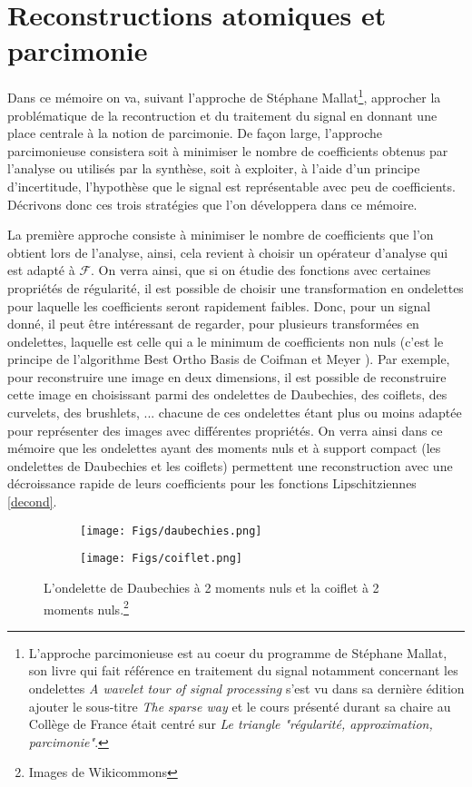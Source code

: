 \section{Reconstructions atomiques et parcimonie}
Dans ce mémoire on va, suivant l'approche de Stéphane Mallat\footnote{L'approche parcimonieuse est au coeur du programme de Stéphane Mallat, son livre qui fait référence en traitement du signal notamment concernant les ondelettes \emph{A wavelet tour of signal processing} s'est vu dans sa dernière édition ajouter le sous-titre \emph{The sparse way} et le cours présenté durant sa chaire au Collège de France était centré sur \emph{Le triangle "régularité, approximation, parcimonie"}.},
approcher la problématique de la recontruction et du traitement du signal en donnant une place centrale à la notion de parcimonie.
De façon large, l'approche parcimonieuse consistera soit à minimiser le nombre de coefficients obtenus par l'analyse ou utilisés par la synthèse, soit à exploiter, à l'aide d'un principe d'incertitude, l'hypothèse que le signal est représentable avec peu de coefficients.
Décrivons donc ces trois stratégies que l'on développera dans ce mémoire.
\newline

La première approche consiste à minimiser le nombre de coefficients que l'on obtient lors de l'analyse, ainsi, cela revient à choisir un opérateur d'analyse qui est adapté à $\mathcal{F}$.
On verra ainsi, que si on étudie des fonctions avec certaines propriétés de régularité, il est possible de choisir une transformation en ondelettes pour laquelle les coefficients seront rapidement faibles. 
Donc, pour un signal donné, il peut être intéressant de regarder, pour plusieurs transformées en ondelettes, laquelle est celle qui a le minimum de coefficients non nuls (c'est le principe de l'algorithme Best Ortho Basis de Coifman et Meyer \cite{coifortho}).
Par exemple, pour reconstruire une image en deux dimensions, il est possible de reconstruire cette image en choisissant parmi des ondelettes de Daubechies, des coiflets, des curvelets, des brushlets, ...
chacune de ces ondelettes étant plus ou moins adaptée pour représenter des images avec différentes propriétés.
On verra ainsi dans ce mémoire que les ondelettes ayant des moments nuls et à support compact (les ondelettes de Daubechies et les coiflets) permettent une reconstruction avec une décroissance rapide de leurs coefficients pour les fonctions Lipschitziennes \ref{decond}.

\begin{figure}[h]%
\centering
\begin{subfigure}{.5\textwidth}
  \centering
  \texttt{[image: Figs/daubechies.png]}
  \label{fig:sub1}
\end{subfigure}%
\begin{subfigure}{.5\textwidth}
  \centering
  \texttt{[image: Figs/coiflet.png]}
  \label{fig:sub2}
\end{subfigure}
	\caption{L'ondelette de Daubechies à 2 moments nuls et la coiflet à 2 moments nuls.\footnote{Images de Wikicommons}}
\label{fig:test}
\end{figure}

